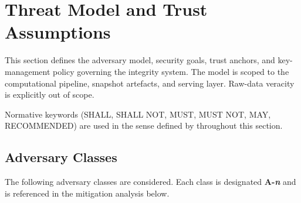 \section{Threat Model and Trust Assumptions}\label{sec:threat-model}

This section defines the adversary model, security goals, trust anchors,
and key-management policy governing the \ISI integrity system.  The model
is scoped to the computational pipeline, snapshot artefacts, and serving
layer.  Raw-data veracity is explicitly out of scope.

Normative keywords (SHALL, SHALL NOT, MUST, MUST NOT, MAY, RECOMMENDED)
are used in the sense defined by \citet{rfc2119} throughout this section.

\subsection{Adversary Classes}\label{sec:threat:adversaries}

The following adversary classes are considered.  Each class is designated
\textbf{A-\textit{n}} and is referenced in the mitigation analysis below.

